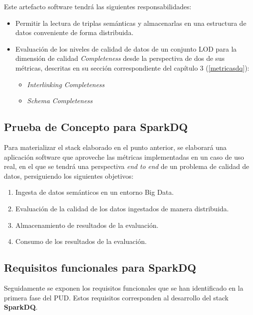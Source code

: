 Este artefacto software tendrá las siguientes responsabilidades:

\begin{itemize}
\item Permitir la lectura de triplas semánticas y almacenarlas en una estructura
  de datos conveniente de forma distribuida.
\item Evaluación de los niveles de calidad de datos de un conjunto \acs{LOD}
  para la dimensión de calidad \textit{Completeness} desde la perspectiva de dos
  de sus métricas, descritas en su sección correspondiente del capítulo 3 (\ref{metricasdq}):
  \begin{itemize}
  \item \textit{Interlinking Completeness}
  \item \textit{Schema Completeness}
  \end{itemize}
\end{itemize}

\subsection{Prueba de Concepto para SparkDQ}

Para materializar el stack elaborado en el punto anterior, se elaborará una
aplicación software que aproveche las métricas implementadas en un caso de uso
real, en el que se tendrá una perspectiva \textit{end to end} de un problema de
calidad de datos, persiguiendo los siguientes objetivos:

\begin{enumerate}
\item Ingesta de datos semánticos en un entorno Big Data.
\item Evaluación de la calidad de los datos ingestados de manera distribuida. 
\item Almacenamiento de resultados de la evaluación.
\item Consumo de los resultados de la evaluación. 
\end{enumerate}

\subsection{Requisitos funcionales para SparkDQ}

Seguidamente se exponen los requisitos funcionales que se han identificado en la
primera fase del \acs{PUD}. Estos requisitos corresponden al desarrollo del
stack \textbf{SparkDQ}.

